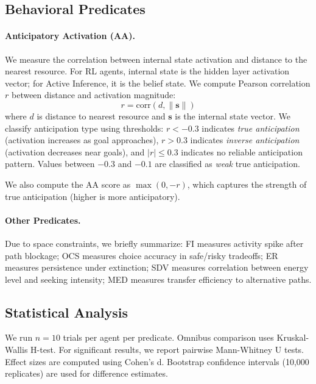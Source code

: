 \documentclass{article}
\begin{document}
\subsection{Behavioral Predicates}

\paragraph{Anticipatory Activation (AA).} We measure the correlation between internal state activation and distance to the nearest resource. For RL agents, internal state is the hidden layer activation vector; for Active Inference, it is the belief state. We compute Pearson correlation $r$ between distance and activation magnitude:
\begin{equation}
    r = \text{corr}(d, \|\mathbf{s}\|)
\end{equation}
where $d$ is distance to nearest resource and $\mathbf{s}$ is the internal state vector. We classify anticipation type using thresholds: $r < -0.3$ indicates \textit{true anticipation} (activation increases as goal approaches), $r > 0.3$ indicates \textit{inverse anticipation} (activation decreases near goals), and $|r| \leq 0.3$ indicates no reliable anticipation pattern. Values between $-0.3$ and $-0.1$ are classified as \textit{weak} true anticipation.

We also compute the AA score as $\max(0, -r)$, which captures the strength of true anticipation (higher is more anticipatory).

\paragraph{Other Predicates.} Due to space constraints, we briefly summarize: FI measures activity spike after path blockage; OCS measures choice accuracy in safe/risky tradeoffs; ER measures persistence under extinction; SDV measures correlation between energy level and seeking intensity; MED measures transfer efficiency to alternative paths.

\subsection{Statistical Analysis}

We run $n=10$ trials per agent per predicate. Omnibus comparison uses Kruskal-Wallis H-test. For significant results, we report pairwise Mann-Whitney U tests. Effect sizes are computed using Cohen's d. Bootstrap confidence intervals (10,000 replicates) are used for difference estimates.
\end{document}

